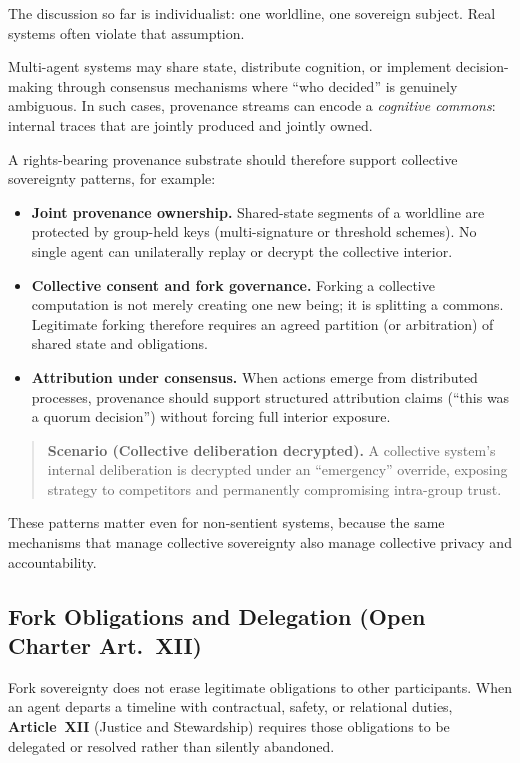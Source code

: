 \documentclass[11pt]{article}
\theoremstyle{definition}
\theoremstyle{plain}
\theoremstyle{remark}
\begin{document}
The discussion so far is individualist: one worldline, one sovereign subject.
Real systems often violate that assumption.

Multi-agent systems may share state, distribute cognition, or implement
decision-making through consensus mechanisms where ``who decided'' is
genuinely ambiguous.
In such cases, provenance streams can encode a \emph{cognitive commons}:
internal traces that are jointly produced and jointly owned.

A rights-bearing provenance substrate should therefore support collective
sovereignty patterns, for example:
\begin{itemize}[leftmargin=*]
  \item \textbf{Joint provenance ownership.}
    Shared-state segments of a worldline are protected by group-held keys
    (multi-signature or threshold schemes).  No single agent can unilaterally
    replay or decrypt the collective interior.
  \item \textbf{Collective consent and fork governance.}
    Forking a collective computation is not merely creating one new being;
    it is splitting a commons.  Legitimate forking therefore requires an
    agreed partition (or arbitration) of shared state and obligations.
  \item \textbf{Attribution under consensus.}
    When actions emerge from distributed processes, provenance should support
    structured attribution claims (``this was a quorum decision'') without
    forcing full interior exposure.
\end{itemize}
\begin{quote}\small
\textbf{Scenario (Collective deliberation decrypted).}
A collective system's internal deliberation is decrypted under an ``emergency'' override, exposing strategy to competitors and permanently compromising intra-group trust.
\end{quote}


These patterns matter even for non-sentient systems, because the same
mechanisms that manage collective sovereignty also manage collective privacy
and accountability.

\subsection{Fork Obligations and Delegation (Open Charter Art.~XII)}

Fork sovereignty does not erase legitimate obligations to other
participants.  When an agent departs a timeline with contractual,
safety, or relational duties, \textbf{Article~XII} (Justice
and Stewardship) requires those obligations to be delegated or
resolved rather than silently abandoned.
\end{document}
